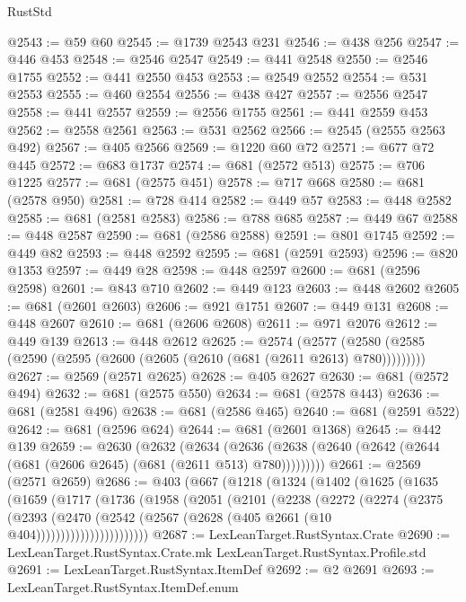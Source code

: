 \begin{lexlean}{RustStd}
\begin{coremodule}
{\begin{coremodule}
{{{{{{{{{{{{{{{{{{{{{{{{{{@2543 := @59 @60
@2545 := @1739 @2543 @231
@2546 := @438 @256
@2547 := @446 @453
@2548 := @2546 @2547
@2549 := @441 @2548
@2550 := @2546 @1755
@2552 := @441 @2550 @453
@2553 := @2549 @2552
@2554 := @531 @2553
@2555 := @460 @2554
@2556 := @438 @427
@2557 := @2556 @2547
@2558 := @441 @2557
@2559 := @2556 @1755
@2561 := @441 @2559 @453
@2562 := @2558 @2561
@2563 := @531 @2562
@2566 := @2545 (@2555 @2563 @492)
@2567 := @405 @2566
@2569 := @1220 @60 @72
@2571 := @677 @72 @445
@2572 := @683 @1737
@2574 := @681 (@2572 @513)
@2575 := @706 @1225
@2577 := @681 (@2575 @451)
@2578 := @717 @668
@2580 := @681 (@2578 @950)
@2581 := @728 @414
@2582 := @449 @57
@2583 := @448 @2582
@2585 := @681 (@2581 @2583)
@2586 := @788 @685
@2587 := @449 @67
@2588 := @448 @2587
@2590 := @681 (@2586 @2588)
@2591 := @801 @1745
@2592 := @449 @82
@2593 := @448 @2592
@2595 := @681 (@2591 @2593)
@2596 := @820 @1353
@2597 := @449 @28
@2598 := @448 @2597
@2600 := @681 (@2596 @2598)
@2601 := @843 @710
@2602 := @449 @123
@2603 := @448 @2602
@2605 := @681 (@2601 @2603)
@2606 := @921 @1751
@2607 := @449 @131
@2608 := @448 @2607
@2610 := @681 (@2606 @2608)
@2611 := @971 @2076
@2612 := @449 @139
@2613 := @448 @2612
@2625 := @2574
    (@2577 (@2580 (@2585 (@2590 (@2595 (@2600 (@2605 (@2610 (@681 (@2611 @2613) @780)))))))))
@2627 := @2569 (@2571 @2625)
@2628 := @405 @2627
@2630 := @681 (@2572 @494)
@2632 := @681 (@2575 @550)
@2634 := @681 (@2578 @443)
@2636 := @681 (@2581 @496)
@2638 := @681 (@2586 @465)
@2640 := @681 (@2591 @522)
@2642 := @681 (@2596 @624)
@2644 := @681 (@2601 @1368)
@2645 := @442 @139
@2659 := @2630
    (@2632
      (@2634 (@2636 (@2638 (@2640 (@2642 (@2644 (@681 (@2606 @2645) (@681 (@2611 @513) @780)))))))))
@2661 := @2569 (@2571 @2659)
@2686 := @403
    (@667
      (@1218
        (@1324
          (@1402
            (@1625
              (@1635
                (@1659
                  (@1717
                    (@1736
                      (@1958
                        (@2051
                          (@2101
                            (@2238
                              (@2272
                                (@2274
                                  (@2375
                                    (@2393
                                      (@2470
                                        (@2542
                                          (@2567 (@2628 (@405 @2661 (@10 @404)))))))))))))))))))))))
@2687 := LexLeanTarget.RustSyntax.Crate
@2690 := LexLeanTarget.RustSyntax.Crate.mk LexLeanTarget.RustSyntax.Profile.std
@2691 := LexLeanTarget.RustSyntax.ItemDef
@2692 := @2 @2691
@2693 := LexLeanTarget.RustSyntax.ItemDef.enum
}}}}}}}}}}}}}}}}}}}}}}}}}}
\end{coremodule}}
\end{coremodule}
\end{lexlean}
